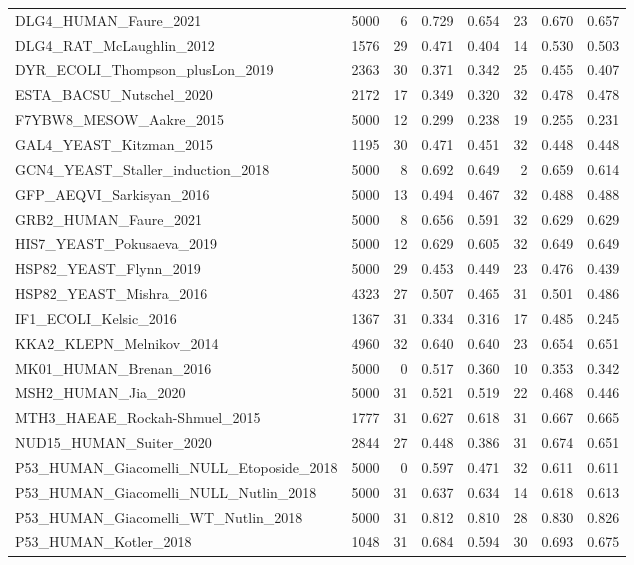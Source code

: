 \documentclass[11pt,a4paper]{article}
\begin{document}
\begin{table}[H]
\begin{tabular}{lrrrrrrr}
DLG4\_HUMAN\_Faure\_2021 & 5000 & 6 & 0.729 & 0.654 & 23 & 0.670 & 0.657 \\
DLG4\_RAT\_McLaughlin\_2012 & 1576 & 29 & 0.471 & 0.404 & 14 & 0.530 & 0.503 \\
DYR\_ECOLI\_Thompson\_plusLon\_2019 & 2363 & 30 & 0.371 & 0.342 & 25 & 0.455 & 0.407 \\
ESTA\_BACSU\_Nutschel\_2020 & 2172 & 17 & 0.349 & 0.320 & 32 & 0.478 & 0.478 \\
F7YBW8\_MESOW\_Aakre\_2015 & 5000 & 12 & 0.299 & 0.238 & 19 & 0.255 & 0.231 \\
GAL4\_YEAST\_Kitzman\_2015 & 1195 & 30 & 0.471 & 0.451 & 32 & 0.448 & 0.448 \\
GCN4\_YEAST\_Staller\_induction\_2018 & 5000 & 8 & 0.692 & 0.649 & 2 & 0.659 & 0.614 \\
GFP\_AEQVI\_Sarkisyan\_2016 & 5000 & 13 & 0.494 & 0.467 & 32 & 0.488 & 0.488 \\
GRB2\_HUMAN\_Faure\_2021 & 5000 & 8 & 0.656 & 0.591 & 32 & 0.629 & 0.629 \\
HIS7\_YEAST\_Pokusaeva\_2019 & 5000 & 12 & 0.629 & 0.605 & 32 & 0.649 & 0.649 \\
HSP82\_YEAST\_Flynn\_2019 & 5000 & 29 & 0.453 & 0.449 & 23 & 0.476 & 0.439 \\
HSP82\_YEAST\_Mishra\_2016 & 4323 & 27 & 0.507 & 0.465 & 31 & 0.501 & 0.486 \\
IF1\_ECOLI\_Kelsic\_2016 & 1367 & 31 & 0.334 & 0.316 & 17 & 0.485 & 0.245 \\
KKA2\_KLEPN\_Melnikov\_2014 & 4960 & 32 & 0.640 & 0.640 & 23 & 0.654 & 0.651 \\
MK01\_HUMAN\_Brenan\_2016 & 5000 & 0 & 0.517 & 0.360 & 10 & 0.353 & 0.342 \\
MSH2\_HUMAN\_Jia\_2020 & 5000 & 31 & 0.521 & 0.519 & 22 & 0.468 & 0.446 \\
MTH3\_HAEAE\_Rockah-Shmuel\_2015 & 1777 & 31 & 0.627 & 0.618 & 31 & 0.667 & 0.665 \\
NUD15\_HUMAN\_Suiter\_2020 & 2844 & 27 & 0.448 & 0.386 & 31 & 0.674 & 0.651 \\
P53\_HUMAN\_Giacomelli\_NULL\_Etoposide\_2018 & 5000 & 0 & 0.597 & 0.471 & 32 & 0.611 & 0.611 \\
P53\_HUMAN\_Giacomelli\_NULL\_Nutlin\_2018 & 5000 & 31 & 0.637 & 0.634 & 14 & 0.618 & 0.613 \\
P53\_HUMAN\_Giacomelli\_WT\_Nutlin\_2018 & 5000 & 31 & 0.812 & 0.810 & 28 & 0.830 & 0.826 \\
P53\_HUMAN\_Kotler\_2018 & 1048 & 31 & 0.684 & 0.594 & 30 & 0.693 & 0.675 \\

\end{tabular}
\end{table}
\end{document}
